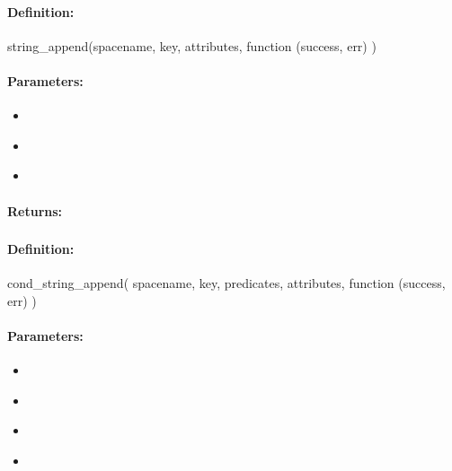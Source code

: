 \paragraph{Definition:}
\begin{javascriptcode}
string_append(spacename, key, attributes, function (success, err) {})
\end{javascriptcode}
\paragraph{Parameters:}
\begin{itemize}[noitemsep]
\item {}\\

\item {}\\

\item {}\\

\end{itemize}

\paragraph{Returns:}


\pagebreak
\subsubsection{}
\label{api:nodejs:cond_string_append}


\paragraph{Definition:}
\begin{javascriptcode}
cond_string_append(
        spacename, key, predicates, attributes, function (success, err) {})
\end{javascriptcode}
\paragraph{Parameters:}
\begin{itemize}[noitemsep]
\item {}\\

\item {}\\

\item {}\\

\item {}\\

\end{itemize}

